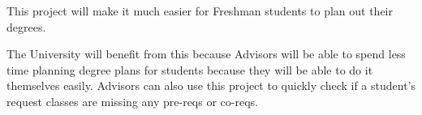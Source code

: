 This project will make it much easier for Freshman students to plan out their degrees.

The University will benefit from this because Advisors will be able to spend less time
    planning degree plans for students because they will be able to do it themselves easily.
    Advisors can also use this project to quickly check if a student's request classes are
    missing any pre-reqs or co-reqs.